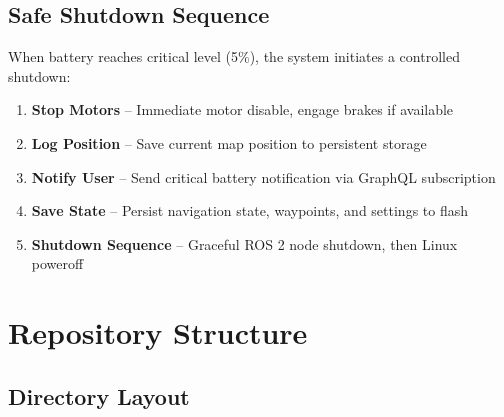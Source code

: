 \documentclass[11pt,letterpaper]{article}
\begin{document}
\subsection{Safe Shutdown Sequence}

When battery reaches critical level (5\%), the system initiates a controlled shutdown:

\begin{enumerate}
    \item \textbf{Stop Motors} -- Immediate motor disable, engage brakes if available
    \item \textbf{Log Position} -- Save current map position to persistent storage
    \item \textbf{Notify User} -- Send critical battery notification via GraphQL subscription
    \item \textbf{Save State} -- Persist navigation state, waypoints, and settings to flash
    \item \textbf{Shutdown Sequence} -- Graceful ROS 2 node shutdown, then Linux poweroff
\end{enumerate}

\section{Repository Structure}

\subsection{Directory Layout}
\end{document}

